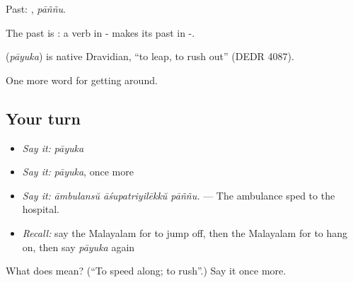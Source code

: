 Past: , \emph{pāññu}.

The past is : a verb in - makes its past in -.

\begin{cousinweb}
\textbf{} (\emph{pāyuka}) is native Dravidian, \textquotedblleft{}to leap, to rush out\textquotedblright{} (DEDR 4087).
\end{cousinweb}

\begin{grammarlens}[title={What you've built}]
One more word for getting around.
\end{grammarlens}

\subsection*{Your turn}
\begin{itemize}
\raggedright
  \item \emph{Say it:} \emph{pāyuka}
  \item \emph{Say it:} \emph{pāyuka}, once more
  \item \emph{Say it:} \emph{āmbulansŭ āśupatriyilēkkŭ pāññu.} — The ambulance sped to the hospital.
  \item \emph{Recall:} say the Malayalam for to jump off, then the Malayalam for to hang on, then say \emph{pāyuka} again
\end{itemize}

\begin{tcolorbox}[breakable,colback=teal!4,colframe=teal!35!black,title={Before you move on}]
What does  mean? (\textquotedblleft{}To speed along; to rush\textquotedblright{}.) Say it once more.
\end{tcolorbox}
